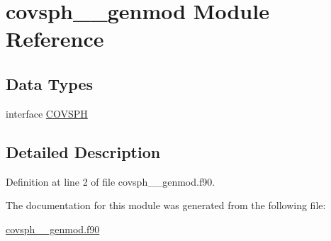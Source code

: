 \hypertarget{classcovsph____genmod}{\section{covsph\+\_\+\+\_\+genmod Module Reference}
\label{classcovsph____genmod}
}
\subsection*{Data Types}
\begin{DoxyCompactItemize}
\item 
interface \hyperlink{interfacecovsph____genmod_1_1COVSPH}{C\+O\+V\+S\+P\+H}
\end{DoxyCompactItemize}


\subsection{Detailed Description}


Definition at line 2 of file covsph\+\_\+\+\_\+genmod.\+f90.



The documentation for this module was generated from the following file\+:\begin{DoxyCompactItemize}
\item 
\hyperlink{covsph____genmod_8f90}{covsph\+\_\+\+\_\+genmod.\+f90}\end{DoxyCompactItemize}
